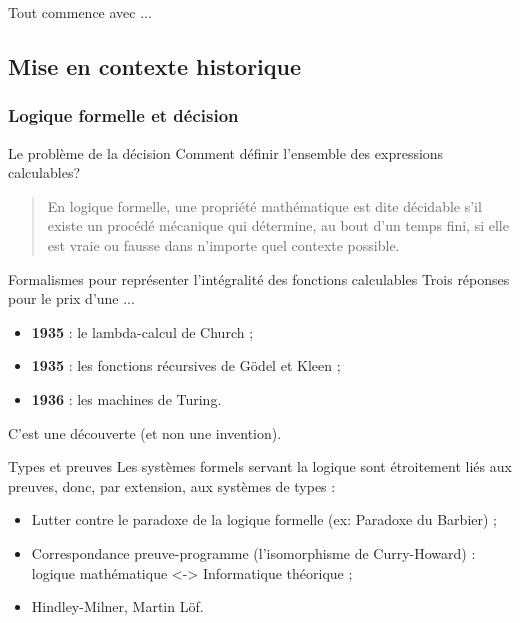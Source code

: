 \documentclass{beamer}
\newcommand{\adjustimg}{%
  \checkoddpage%
  \ifoddpage\hspace*{
		\dimexpr\evensidemargin-\oddsidemargin}\else\hspace*{
			-\dimexpr\evensidemargin-\oddsidemargin}\fi%
}
\newcommand{\centerimg}[2][width=\textwidth]{%
  \makebox[\textwidth]{\adjustimg\texttt{[image: \#2]}}%
}
\begin{document}
  \begin{frame}
    Tout commence avec ...
  \end{frame}

	\subsection{Mise en contexte historique}
	\subsubsection{Logique formelle et décision}
	\begin{frame}{Le problème de la décision}
		Comment définir l'ensemble des expressions calculables?
		\begin{quote}
			En logique formelle,
			une propriété mathématique est dite décidable s'il existe un procédé
			mécanique qui détermine, au bout d'un temps fini, si elle est vraie ou
			fausse dans n'importe quel contexte possible.
		\end{quote}
	\end{frame}

	\begin{frame}
		\centerimg[width=\textwidth, height=250pt]{figures/logic.pdf}
	\end{frame}

	\begin{frame}{Formalismes pour représenter \newline l'intégralité des fonctions calculables}
		Trois réponses pour le prix d'une ...
		\begin{itemize}
			\item \textbf{1935} : \alert{le lambda-calcul} de Church ;
			\item \textbf{1935} : les fonctions récursives de Gödel et Kleen ;
			\item \textbf{1936} : les machines de Turing.
		\end{itemize}
		C'est une découverte (et non une invention).
	\end{frame}

  \begin{frame}{Types et preuves}
    Les systèmes formels servant la logique sont étroitement liés aux preuves,
    donc, par extension, aux systèmes de types :
    \begin{itemize}
      \item Lutter contre le paradoxe de la logique formelle (ex: Paradoxe du Barbier) ;
      \item Correspondance preuve-programme (l'isomorphisme de Curry-Howard) : logique mathématique <-> Informatique théorique ;
      \item Hindley-Milner, Martin Löf.
    \end{itemize}
  \end{frame}
\end{document}
